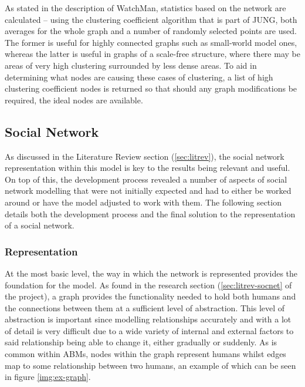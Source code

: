 \documentclass[]{report}
\begin{document}
As stated in the description of WatchMan, statistics based on the network are calculated – using the clustering coefficient algorithm that is part of JUNG, both averages for the whole graph and a number of randomly selected points are used. The former is useful for highly connected graphs such as small-world model ones, whereas the latter is useful in graphs of a scale-free structure, where there may be areas of very high clustering surrounded by less dense areas. To aid in determining what nodes are causing these cases of clustering, a list of high clustering coefficient nodes is returned so that should any graph modifications be required, the ideal nodes are available.

\subsection{Social Network}
As discussed in the Literature Review section (\ref{sec:litrev}), the social network representation within this model is key to the results being relevant and useful. On top of this, the development process revealed a number of aspects of social network modelling that were not initially expected and had to either be worked around or have the model adjusted to work with them. The following section details both the development process and the final solution to the representation of a social network.

\subsubsection{Representation}

At the most basic level, the way in which the network is represented provides the foundation for the model. As found in the research section (\ref{sec:litrev-socnet} of the project), a graph provides the functionality needed to hold both humans and the connections between them at a sufficient level of abstraction. This level of abstraction is important since modelling relationships accurately and with a lot of detail is very difficult due to a wide variety of internal and external factors to said relationship being able to change it, either gradually or suddenly. As is common within ABMs, nodes within the graph represent humans whilst edges map to some relationship between two humans, an example of which can be seen in figure \ref{img:ex-graph}.
\end{document}

